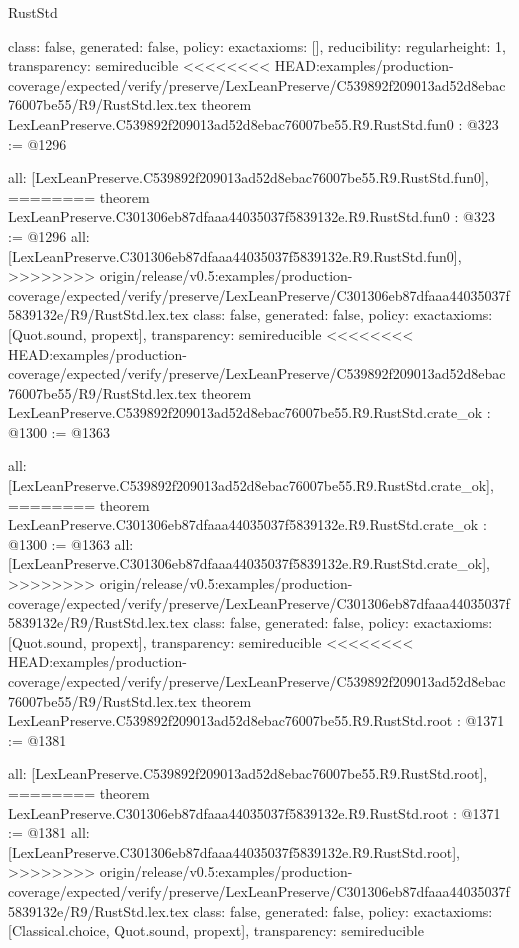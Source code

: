 \begin{lexlean}{RustStd}
\begin{coremodule}
{\begin{coremodule}
{{{  class: false,
  generated: false,
  policy: exact{axioms: []},
  reducibility: regular{height: 1},
  transparency: semireducible
}
<<<<<<<< HEAD:examples/production-coverage/expected/verify/preserve/LexLeanPreserve/C539892f209013ad52d8ebac76007be55/R9/RustStd.lex.tex
theorem LexLeanPreserve.C539892f209013ad52d8ebac76007be55.R9.RustStd.fun0 : @323 := @1296 {
  all: [LexLeanPreserve.C539892f209013ad52d8ebac76007be55.R9.RustStd.fun0],
========
theorem LexLeanPreserve.C301306eb87dfaaa44035037f5839132e.R9.RustStd.fun0 : @323 := @1296 {
  all: [LexLeanPreserve.C301306eb87dfaaa44035037f5839132e.R9.RustStd.fun0],
>>>>>>>> origin/release/v0.5:examples/production-coverage/expected/verify/preserve/LexLeanPreserve/C301306eb87dfaaa44035037f5839132e/R9/RustStd.lex.tex
  class: false,
  generated: false,
  policy: exact{axioms: [Quot.sound, propext]},
  transparency: semireducible
}
<<<<<<<< HEAD:examples/production-coverage/expected/verify/preserve/LexLeanPreserve/C539892f209013ad52d8ebac76007be55/R9/RustStd.lex.tex
theorem LexLeanPreserve.C539892f209013ad52d8ebac76007be55.R9.RustStd.crate_ok : @1300 := @1363 {
  all: [LexLeanPreserve.C539892f209013ad52d8ebac76007be55.R9.RustStd.crate_ok],
========
theorem LexLeanPreserve.C301306eb87dfaaa44035037f5839132e.R9.RustStd.crate_ok : @1300 := @1363 {
  all: [LexLeanPreserve.C301306eb87dfaaa44035037f5839132e.R9.RustStd.crate_ok],
>>>>>>>> origin/release/v0.5:examples/production-coverage/expected/verify/preserve/LexLeanPreserve/C301306eb87dfaaa44035037f5839132e/R9/RustStd.lex.tex
  class: false,
  generated: false,
  policy: exact{axioms: [Quot.sound, propext]},
  transparency: semireducible
}
<<<<<<<< HEAD:examples/production-coverage/expected/verify/preserve/LexLeanPreserve/C539892f209013ad52d8ebac76007be55/R9/RustStd.lex.tex
theorem LexLeanPreserve.C539892f209013ad52d8ebac76007be55.R9.RustStd.root : @1371 := @1381 {
  all: [LexLeanPreserve.C539892f209013ad52d8ebac76007be55.R9.RustStd.root],
========
theorem LexLeanPreserve.C301306eb87dfaaa44035037f5839132e.R9.RustStd.root : @1371 := @1381 {
  all: [LexLeanPreserve.C301306eb87dfaaa44035037f5839132e.R9.RustStd.root],
>>>>>>>> origin/release/v0.5:examples/production-coverage/expected/verify/preserve/LexLeanPreserve/C301306eb87dfaaa44035037f5839132e/R9/RustStd.lex.tex
  class: false,
  generated: false,
  policy: exact{axioms: [Classical.choice, Quot.sound, propext]},
  transparency: semireducible
}

}}}}}
\end{coremodule}}
\end{coremodule}
\end{lexlean}
